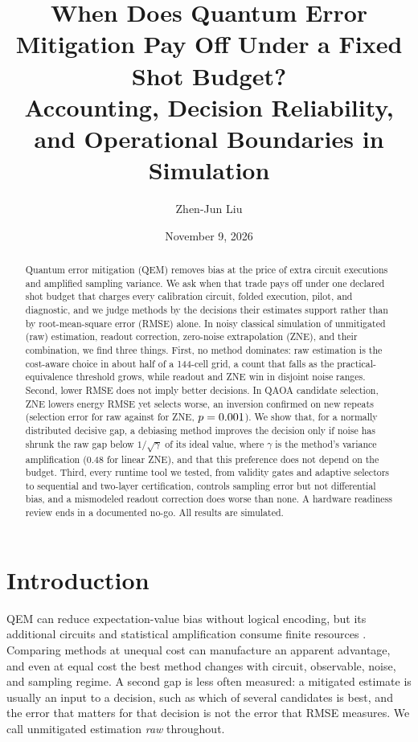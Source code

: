 \documentclass[10pt,twocolumn]{article}
\title{When Does Quantum Error Mitigation Pay Off Under a Fixed Shot Budget?\\
Accounting, Decision Reliability, and Operational Boundaries in Simulation}
\author{Zhen-Jun Liu}
\date{November 9, 2026}
\begin{document}
\maketitle

\begin{abstract}
Quantum error mitigation (QEM) removes bias at the price of extra circuit executions and amplified
sampling variance. We ask when that trade pays off under one declared shot budget that charges every
calibration circuit, folded execution, pilot, and diagnostic, and we judge methods by the decisions
their estimates support rather than by root-mean-square error (RMSE) alone. In noisy classical
simulation of unmitigated (raw) estimation, readout correction, zero-noise extrapolation (ZNE), and
their combination, we find three things. First, no method dominates: raw estimation is the
cost-aware choice in about half of a 144-cell grid, a count that falls as the practical-equivalence
threshold grows, while readout and ZNE win in disjoint noise ranges. Second, lower RMSE does not imply
better decisions. In QAOA candidate selection, ZNE lowers energy RMSE yet selects worse, an inversion
confirmed on new repeats (selection error \CoreRawError{} for raw against \CoreZneError{} for ZNE,
$p=0.001$). We show that, for a normally distributed decisive gap, a debiasing method improves
the decision only if noise has shrunk the raw gap below $1/\sqrt{\gamma}$ of its ideal value, where
$\gamma$ is the method's variance amplification (0.48 for linear ZNE), and that this preference does
not depend on the budget. Third, every runtime tool we tested, from validity gates and adaptive
selectors to sequential and two-layer certification, controls sampling error but not differential
bias, and a mismodeled readout correction does worse than none. A hardware readiness review ends in a
documented no-go. All results are simulated.
\end{abstract}

\section{Introduction}
QEM can reduce expectation-value bias without logical encoding, but its additional circuits and
statistical amplification consume finite resources \cite{temme2017,li2017,cai2023}. Comparing
methods at unequal cost can manufacture an apparent advantage, and even at equal cost the best
method changes with circuit, observable, noise, and sampling regime. A second gap is less often
measured: a mitigated estimate is usually an input to a decision, such as which of several
candidates is best, and the error that matters for that decision is not the error that RMSE
measures. We call unmitigated estimation \emph{raw} throughout.
\end{document}
